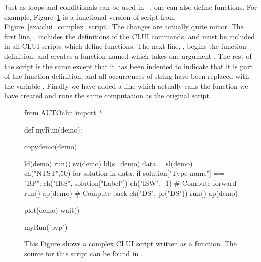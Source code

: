 \documentclass[12pt]{report}
\begin{document}
 Just as loops and conditionals can be used in \python~,
 one can also define functions.  For example,
 Figure~\ref{exa:clui_complex_function} is a
 functional version of script from 
 Figure~\ref{exa:clui_complex_script}.
 The changes are actually quite minor.  
 The first line, ,
 includes the definitions of the \AUTO CLUI commands,
 and must be included in all \AUTO CLUI scripts
 which define functions.
 The next line, 
 ,
 begins the function definition, and 
 creates a function named  which
 takes one argument .  The
 rest of the script is the same except that it
 has been indented to indicate that it is
 part of the function definition, and all occurrences
 of string  have been replaced
 with the variable .
 Finally we have added a line 
 which actually calls the function we have 
 created and runs the same computation as
 the original script.

 \begin{figure}[htbp]
 {\small \begin{center} \begin{boxedverbatim}
 from AUTOclui import *

 def myRun(demo):

     copydemo(demo)

     ld(demo)
     run()
     sv(demo)
     ld(s=demo)
     data = sl(demo)
     ch("NTST",50)
     for solution in data:
         if solution["Type name"] == "BP":
             ch("IRS", solution["Label"])
             ch("ISW", -1)
             # Compute forward
             run()
             ap(demo)
             # Compute back
             ch("DS",-pr("DS"))
             run()
             ap(demo)

     plot(demo)
     wait()

 myRun('bvp')

 \end{boxedverbatim}
 \end{center} 
 }
 \caption[A complex \AUTO CLUI script as a function.]
 {This Figure shows a complex \AUTO CLUI script
 written as a function.
 The source for this script can be found in .
 }
 \label{exa:clui_complex_function}
 \end{figure}
\end{document}
